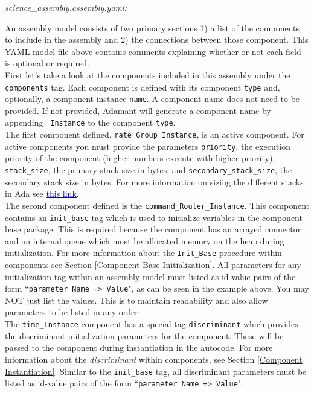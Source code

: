 \textit{science\_assembly.assembly.yaml:}

An assembly model consists of two primary sections 1) a list of the components to include in the assembly and 2) the connections between those component. This YAML model file above contains comments explaining whether or not each field is optional or required. \\

First let's take a look at the components included in this assembly under the \texttt{components} tag. Each component is defined with its component \texttt{type} and, optionally, a component instance \texttt{name}. A component name does not need to be provided. If not provided, Adamant will generate a component name by appending \texttt{\_Instance} to the component \texttt{type}. \\

The first component defined, \texttt{rate\_Group\_Instance}, is an active component. For active components you must provide the parameters \texttt{priority}, the execution priority of the component (higher numbers execute with higher priority), \texttt{stack\_size}, the primary stack size in bytes, and \texttt{secondary\_stack\_size}, the secondary stack size in bytes. For more information on sizing the different stacks in Ada see \href{https://docs.adacore.com/gnat_ugx-docs/html/gnat_ugx/gnat_ugx/the_stacks.html}{\textcolor{blue}{this link}}. \\

The second component defined is the \texttt{command\_Router\_Instance}. This component contains an \texttt{init\_base} tag which is used to initialize variables in the component base package. This is required because the component has an arrayed connector and an internal queue which must be allocated memory on the heap during initialization. For more information about the \texttt{Init\_Base} procedure within components see Section \ref{Component Base Initialization}. All parameters for any initialization tag within an assembly model must listed as id-value pairs of the form ``\texttt{parameter\_Name => Value}", as can be seen in the example above. You may NOT just list the values. This is to maintain readability and also allow parameters to be listed in any order. \\

The \texttt{time\_Instance} component has a special tag \texttt{discriminant} which provides the discriminant initialization parameters for the component. These will be passed to the component during instantiation in the autocode. For more information about the \textit{discriminant} within components, see Section \ref{Component Instantiation}. Similar to the \texttt{init\_base} tag, all discriminant parameters must be listed as id-value pairs of the form ``\texttt{parameter\_Name => Value}". \\

